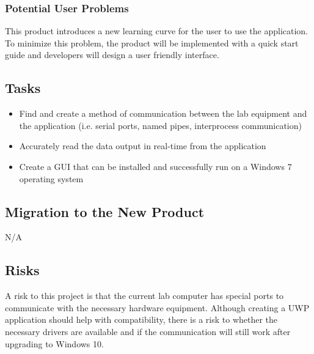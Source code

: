 \documentclass[12pt, titlepage]{article}
\begin{document}
  \subsubsection{Potential User Problems}
This product introduces a new learning curve for the user to use the application. 
To minimize this problem, the product will be implemented with a quick start guide and developers will design a user friendly interface.


\subsection{Tasks}
\begin{itemize}
  \item Find and create a method of communication between the lab equipment and the application (i.e. serial ports, named pipes, interprocess communication)
  \item Accurately read the data output in real-time from the application
  \item Create a GUI that can be installed and successfully run on a Windows 7 operating system
\end{itemize}

\subsection{Migration to the New Product}
N/A

\subsection{Risks}
A risk to this project is that the current lab computer has special ports to communicate with the necessary hardware equipment. Although creating a UWP application should help with compatibility,
there is a risk to whether the necessary drivers are available and if the communication will still work after upgrading to Windows 10. \\
\end{document}
